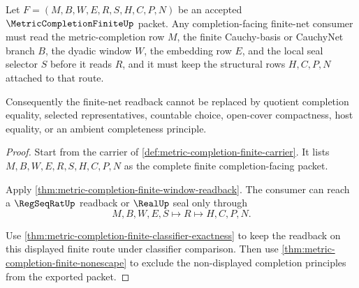 \begin{theorem}
\label{thm:metric-completion-finite-net-limit}
Let $F=(M,B,W,E,R,S,H,C,P,N)$ be an accepted
$\MetricCompletionFiniteUp$ packet. Any completion-facing finite-net consumer
must read the metric-completion row $M$, the finite Cauchy-basis or CauchyNet
branch $B$, the dyadic window $W$, the embedding row $E$, and the local seal
selector $S$ before it reads $R$, and it must keep the structural rows
$H,C,P,N$ attached to that route.

Consequently the finite-net readback cannot be replaced by quotient completion
equality, selected representatives, countable choice, open-cover compactness,
host equality, or an ambient completeness principle.
\end{theorem}
\begin{proof}
Start from the carrier of \autoref{def:metric-completion-finite-carrier}. It
lists $M,B,W,E,R,S,H,C,P,N$ as the complete finite completion-facing packet.

Apply \autoref{thm:metric-completion-finite-window-readback}. The consumer can
reach a $\RegSeqRatUp$ readback or $\RealUp$ seal only through
$$
M,B,W,E,S \longmapsto R \longmapsto H,C,P,N .
$$

Use \autoref{thm:metric-completion-finite-classifier-exactness} to keep the
readback on this displayed finite route under classifier comparison. Then use
\autoref{thm:metric-completion-finite-nonescape} to exclude the non-displayed
completion principles from the exported packet.
\end{proof}

